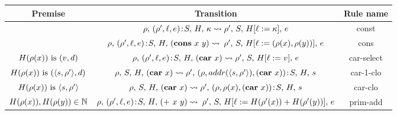 \documentclass[9pt,preprint,nonatbib]{sigplanconf}
\begin{document}
\begin{figure}[t!]

\begin{center}\footnotesize
\renewcommand{\arraystretch}{1.2}
\begin{tabular}{|c|c|c|}
\hline
Premise & Transition & Rule name \\
\hline
\hline 
          & $\rho,\, (\rho', \ell, e)\!:\!S,\, H,\, \kappa
  \rightsquigarrow \rho',\, S,\, H[\ell := \kappa],\, e$    &  {\sc const}
\\
\hline
          & {$\rho, \,(\rho', \ell, e)\!:\!S,\, H,\, (\mbox{$\mathbf{cons}$}~x~y)
\rightsquigarrow
$  $\rho',\, S,\, H[\ell := (\rho(x), \rho(y))],\, e$}     &  {\sc cons} \\
\hline

$H(\rho(x)) \mbox{ is } (v, d)$ & $\rho,\, (\rho', \ell, e)\!:\!S,\, H,\,
(\mbox{$\mathbf{car}$}~x)  \rightsquigarrow \rho',\, S,\, H[\ell := v],\, e$      &
{\sc car-select} \\
\hline



$H(\rho(x)) \mbox{ is } (\langle s, \rho'\rangle, d)$ & $\rho,\, S,\,  H,\,
(\mbox{$\mathbf{car}$}~x)  \rightsquigarrow \rho', \,(\rho, addr(\langle s, \rho'\rangle), (\mbox{$\mathbf{car}$}~x))\!:\!S,\, H,\, s$      &
{\sc car-1-clo} \\
\hline

$H(\rho(x)) \mbox{ is } \langle s, \rho'\rangle$ & $\rho,\, S,\, H,\, (\mbox{$\mathbf{car}$}~x)
\rightsquigarrow
\rho',\, (\rho, \rho(x), (\mbox{$\mathbf{car}$}~x))\!:\!S, \,H,\, s$      &
{\sc car-clo}
\\
\hline



$H(\rho(x)), H(\rho(y)) \in \mathbb{N}$
 & {$\rho,\, (\rho', \ell, e)\!:\!S,\, H,\, (+~x~y)  \rightsquigarrow$
$\rho', \,S,\, H[\ell := H(\rho'(x)) + H(\rho'(y))],\, e$}      &
{\sc prim-add} \\
\hline


\end{tabular}
\end{center}
\end{figure}
\end{document}
